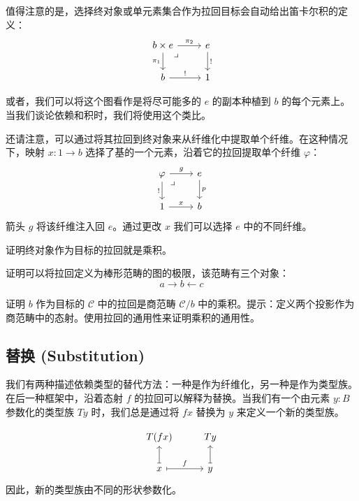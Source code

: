 \documentclass[DaoFP]{subfiles}
\begin{document}
 值得注意的是，选择终对象或单元素集合作为拉回目标会自动给出笛卡尔积的定义：
 \[
  \begin{tikzcd}
   b \times e
   \arrow[d, "\pi_1"']
   \arrow[r, "\pi_2"]
   \arrow[dr, phantom,  , very near start, "\lrcorner"]
   & e
   \arrow[d, "!"]
   \\
   b
   \arrow[r, "!"]
   &
   1
  \end{tikzcd}
 \]

 或者，我们可以将这个图看作是将尽可能多的 $e$ 的副本种植到 $b$ 的每个元素上。当我们谈论依赖和积时，我们将使用这个类比。

 还请注意，可以通过将其拉回到终对象来从纤维化中提取单个纤维。在这种情况下，映射 $x \colon 1 \to b$ 选择了基的一个元素，沿着它的拉回提取单个纤维 $\varphi$：
 \[
  \begin{tikzcd}
   \varphi
   \arrow[d, "!"']
   \arrow[r, "g"]
   \arrow[dr, phantom,  , very near start, "\lrcorner"]
   & e
   \arrow[d, "p"]
   \\
   1
   \arrow[r, "x"]
   &
   b
  \end{tikzcd}
 \]
 箭头 $g$ 将该纤维注入回 $e$。通过更改 $x$ 我们可以选择 $e$ 中的不同纤维。

 \begin{exercise}
  证明终对象作为目标的拉回就是乘积。
 \end{exercise}
 \begin{exercise}
  证明可以将拉回定义为棒形范畴的图的极限，该范畴有三个对象：
  \[ a \rightarrow b \leftarrow c \]
 \end{exercise}

 \begin{exercise}
  证明 $b$ 作为目标的 $\mathcal{C}$ 中的拉回是商范畴 $\mathcal{C}/b$ 中的乘积。提示：定义两个投影作为商范畴中的态射。使用拉回的通用性来证明乘积的通用性。
 \end{exercise}

 \subsection{替换 (Substitution)}

 我们有两种描述依赖类型的替代方法：一种是作为纤维化，另一种是作为类型族。在后一种框架中，沿着态射 $f$ 的拉回可以解释为替换。当我们有一个由元素 $y \colon B$ 参数化的类型族 $T y$ 时，我们总是通过将 $f x$ 替换为 $y$ 来定义一个新的类型族。

 \[
  \begin{tikzcd}
   T (f x)
   & T y
   \\
   x
   \arrow[u, mapsto, ""]
   \arrow[r, mapsto, "f"]
   &y
   \arrow[u, mapsto, ""]
  \end{tikzcd}
 \]
 因此，新的类型族由不同的形状参数化。
\end{document}
